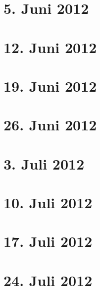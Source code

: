 \documentclass[a4paper,12pt]{report}
\theoremstyle{break}
\theoremstyle{nonumberbreak}
\theoremstyle{nonumberplain}
\begin{document}
\newpage
\section{5. Juni 2012}
\setcounter{Aufg}{0}
\setcounter{Loes}{0}

\newpage
\section{12. Juni 2012}
\setcounter{Aufg}{0}
\setcounter{Loes}{0}

\newpage
\section{19. Juni 2012}
\setcounter{Aufg}{0}
\setcounter{Loes}{0}

\newpage
\section{26. Juni 2012}
\setcounter{Aufg}{0}
\setcounter{Loes}{0}

\newpage
\section{3. Juli 2012}
\setcounter{Aufg}{0}
\setcounter{Loes}{0}

\newpage
\section{10. Juli 2012}
\setcounter{Aufg}{0}
\setcounter{Loes}{0}

\newpage
\section{17. Juli 2012}
\setcounter{Aufg}{0}
\setcounter{Loes}{0}

\newpage
\section{24. Juli 2012}
\setcounter{Aufg}{0}
\setcounter{Loes}{0}
\end{document}
